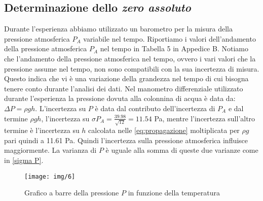\subsection{Determinazione dello \emph{zero assoluto}}
Durante l'esperienza abbiamo utilizzato un barometro per la misura della pressione atmosferica $P_A$ variabile nel tempo. 
Riportiamo i valori dell'andamento della pressione atmosferica $P_A$ nel tempo in Tabella 5 in Appedice B.
Notiamo che l'andamento della pressione atmosferica nel tempo, ovvero i vari valori che la pressione assume nel tempo, non sono compatibili con la sua incertezza di misura.
Questo indica che vi è una variazione della grandezza nel tempo di cui bisogna tenere conto durante l'analisi dei dati.
Nel manometro differenziale utilizzato durante l'esperienza la pressione dovuta alla colonnina di acqua è data da: $\Delta P = \rho gh$. 
L'incertezza su $P$ è data dal contributo dell'incertezza di $P_A$ e dal termine $\rho gh$, l'incertezza su $\sigma P_A = \frac{39.98}{\sqrt{12}} = 11.54$ Pa, mentre l'incertezza sull'altro termine è l'incertezza su $h$ calcolata nelle \eqref{eq:propagazione} moltiplicata per $\rho g$ pari quindi a 11.61 Pa.  
Quindi l'incertezza sulla pressione atmosferica influisce maggiormente.
La varianza di $P$ è uguale alla somma di queste due varianze come in \eqref{sigma P}.

\begin{figure}[H]
\centering
\texttt{[image: img/6]}
\caption{Grafico a barre della pressione $P$ in funzione della temperatura}
\end{figure}








